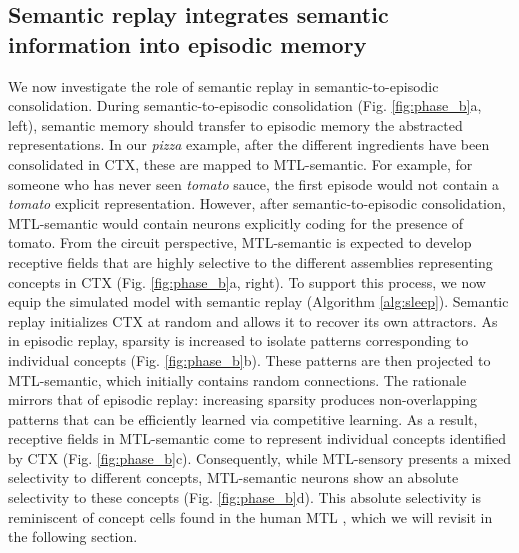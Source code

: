 \documentclass{article}
\begin{document}
\subsection*{Semantic replay integrates semantic information into episodic memory}
We now investigate the role of semantic replay in semantic-to-episodic consolidation. During semantic-to-episodic consolidation (Fig. \ref{fig:phase_b}a, left), semantic memory should transfer to episodic memory the abstracted representations. In our \textit{pizza} example, after the different ingredients have been consolidated in CTX, these are mapped to MTL-semantic. For example, for someone who has never seen \textit{tomato} sauce, the first episode would not contain a \textit{tomato} explicit representation. However, after semantic-to-episodic consolidation, MTL-semantic would contain neurons explicitly coding for the presence of tomato. From the circuit perspective, MTL-semantic is expected to develop receptive fields that are highly selective to the different assemblies representing concepts in CTX (Fig. \ref{fig:phase_b}a, right).
\newline\newline
To support this process, we now equip the simulated model with semantic replay (Algorithm \ref{alg:sleep}). Semantic replay initializes CTX at random and allows it to recover its own attractors. As in episodic replay, sparsity is increased to isolate patterns corresponding to individual concepts (Fig. \ref{fig:phase_b}b). These patterns are then projected to MTL-semantic, which initially contains random connections. The rationale mirrors that of episodic replay: increasing sparsity produces non-overlapping patterns that can be efficiently learned via competitive learning. As a result, receptive fields in MTL-semantic come to represent individual concepts identified by CTX (Fig. \ref{fig:phase_b}c). Consequently, while MTL-sensory presents a mixed selectivity to different concepts, MTL-semantic neurons show an absolute selectivity to these concepts (Fig. \ref{fig:phase_b}d). This absolute selectivity is reminiscent of concept cells found in the human MTL , which we will revisit in the following section.
\newline\newline
\end{document}
